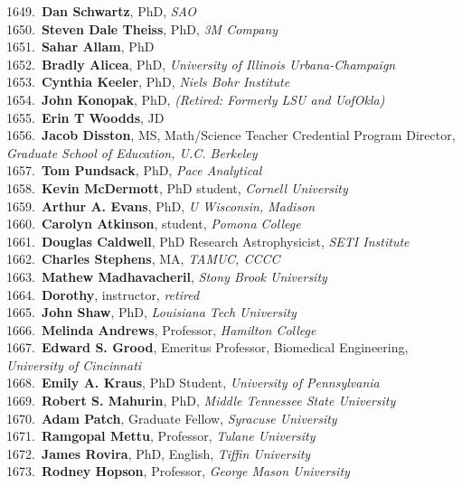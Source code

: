 1649.~{\bf Dan Schwartz}, PhD, {\sl SAO} \\
1650.~{\bf Steven Dale Theiss}, PhD, {\sl 3M Company} \\
1651.~{\bf Sahar Allam}, PhD \\
1652.~{\bf Bradly Alicea}, PhD, {\sl University of Illinois  Urbana-Champaign} \\
1653.~{\bf Cynthia Keeler}, PhD, {\sl Niels Bohr Institute} \\
1654.~{\bf John Konopak}, PhD, {\sl (Retired: Formerly LSU and UofOkla)} \\
1655.~{\bf Erin T Woodds}, JD \\
1656.~{\bf Jacob Disston}, MS, Math/Science Teacher Credential Program Director, {\sl Graduate School of Education, U.C. Berkeley} \\
1657.~{\bf Tom Pundsack}, PhD, {\sl Pace Analytical} \\
1658.~{\bf Kevin McDermott}, PhD student, {\sl Cornell University} \\
1659.~{\bf Arthur A. Evans}, PhD, {\sl U Wisconsin, Madison} \\
1660.~{\bf Carolyn Atkinson}, student, {\sl Pomona College} \\
1661.~{\bf Douglas Caldwell}, PhD Research Astrophysicist, {\sl SETI Institute} \\
1662.~{\bf Charles Stephens}, MA, {\sl TAMUC, CCCC} \\
1663.~{\bf Mathew Madhavacheril}, {\sl Stony Brook University} \\
1664.~{\bf Dorothy}, instructor, {\sl retired} \\
1665.~{\bf John Shaw}, PhD, {\sl Louisiana Tech University} \\
1666.~{\bf Melinda Andrews}, Professor, {\sl Hamilton College} \\
1667.~{\bf Edward S. Grood}, Emeritus Professor, Biomedical Engineering, {\sl University of Cincinnati} \\
1668.~{\bf Emily A. Kraus}, PhD Student, {\sl University of Pennsylvania} \\
1669.~{\bf Robert S. Mahurin}, PhD, {\sl Middle Tennessee State University} \\
1670.~{\bf Adam Patch}, Graduate Fellow, {\sl Syracuse University} \\
1671.~{\bf Ramgopal Mettu}, Professor, {\sl Tulane University} \\
1672.~{\bf James Rovira}, PhD, English, {\sl Tiffin University} \\
1673.~{\bf Rodney Hopson}, Professor, {\sl George Mason University} \\
